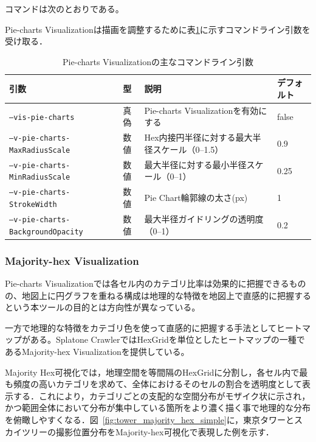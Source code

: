 コマンドは次のとおりである。

Pie-charts Visualizationは描画を調整するために表\ref{tab:pie_charts_params}に示すコマンドライン引数を受け取る．

\begin{table}[h]
\centering\small
\caption{Pie-charts Visualizationの主なコマンドライン引数}
\label{tab:pie_charts_params}
\begin{tabular}{llll}
\hline
引数 & 型 & 説明 & デフォルト \\
\hline
  \texttt{--vis-pie-charts} & 真偽 & Pie-charts Visualizationを有効にする & false \\
  \texttt{--v-pie-charts-MaxRadiusScale} & 数値 & Hex内接円半径に対する最大半径スケール（0–1.5） & 0.9 \\
  \texttt{--v-pie-charts-MinRadiusScale} & 数値 & 最大半径に対する最小半径スケール（0–1） & 0.25 \\
  \texttt{--v-pie-charts-StrokeWidth} & 数値 & Pie Chart輪郭線の太さ(px) & 1 \\
  \texttt{--v-pie-charts-BackgroundOpacity} & 数値 & 最大半径ガイドリングの透明度（0–1） & 0.2 \\
\hline
\end{tabular}
\end{table}

\subsubsection{Majority-hex Visualization}

Pie-charts Visualizationでは各セル内のカテゴリ比率は効果的に把握できるものの、地図上に円グラフを重ねる構成は地理的な特徴を地図上で直感的に把握するという本ツールの目的とは方向性が異なっている。

一方で地理的な特徴をカテゴリ色を使って直感的に把握する手法としてヒートマップがある。Splatone CrawlerではHexGridを単位としたヒートマップの一種であるMajority-hex Visualizationを提供している。

Majority Hex可視化では，地理空間を等間隔のHexGridに分割し，各セル内で最も頻度の高いカテゴリを求めて、全体におけるそのセルの割合を透明度として表示する．これにより，カテゴリごとの支配的な空間分布がモザイク状に示され，かつ範囲全体において分布が集中している箇所をより濃く描く事で地理的な分布を俯瞰しやすくなる．図~\ref{fig:tower_majority_hex_simple}に，東京タワーとスカイツリーの撮影位置分布をMajority-hex可視化で表現した例を示す．

